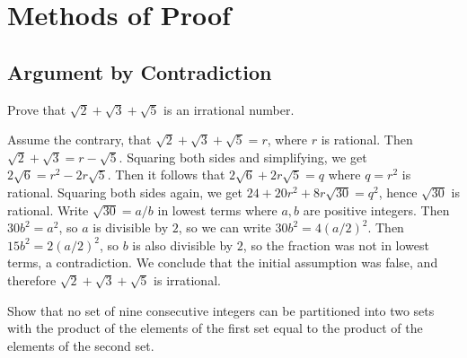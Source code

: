 \chapter{Methods of Proof}

\section{Argument by Contradiction}

\begin{problem}
Prove that $\sqrt{2}+\sqrt{3}+\sqrt{5}$ is an irrational number.
\end{problem}

\begin{solution}
Assume the contrary, that $\sqrt{2}+\sqrt{3}+\sqrt{5}=r$, where $r$ is rational. Then
$\sqrt{2}+\sqrt{3}=r-\sqrt{5}$. Squaring both sides and simplifying, we get $2\sqrt{6}=r^2-2r\sqrt{5}$. 
Then it follows that $2\sqrt{6}+2r\sqrt{5}=q$ where $q=r^2$ is rational. Squaring both sides again, we get $24+20r^2+8r\sqrt{30}=q^2$, hence $\sqrt{30}$ is rational.
Write $\sqrt{30}=a/b$ in lowest terms where $a,b$ are positive integers. Then $30b^2=a^2$, so $a$ is divisible by $2$, so we can write $30b^2=4(a/2)^2$. Then
$15b^2=2(a/2)^2$, so $b$ is also divisible by $2$, so the fraction was not in lowest terms, a contradiction. We conclude that the initial assumption was false, and therefore
$\sqrt{2}+\sqrt{3}+\sqrt{5}$ is irrational.
\end{solution}

\begin{problem}
Show that no set of nine consecutive integers can be partitioned into two sets with the product of the elements of the first set equal to the product of the elements of the second set.
\end{problem}

